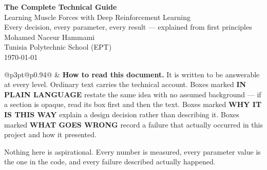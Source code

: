 \documentclass[11pt, a4paper]{report}
\begin{document}
\thispagestyle{empty}
\begin{center}
\vspace*{2.5cm}
{\Huge\bfseries\color{navy} The Complete Technical Guide}\\[10pt]
{\LARGE Learning Muscle Forces with Deep Reinforcement Learning}\\[24pt]
{\large Every decision, every parameter, every result --- explained from first principles}\\[36pt]
{\large Mohamed Naceur Hammami}\\[8pt]
{\normalsize Tunisia Polytechnic School (EPT)}\\[20pt]
{\normalsize\today}
\end{center}

\vspace{2cm}
\noindent
\begin{tabular}{@{}p{3pt}@{\hspace{10pt}}p{0.94\linewidth}@{}}
 & \textbf{How to read this document.} It is written to be
answerable at every level. Ordinary text carries the technical account. Boxes
marked \textbf{\color{accent}IN PLAIN LANGUAGE} restate the same idea with no
assumed background --- if a section is opaque, read its box first and then the
text. Boxes marked \textbf{\color{greenrule}WHY IT IS THIS WAY} explain a design
decision rather than describing it. Boxes marked \textbf{\color{warmrule}WHAT
GOES WRONG} record a failure that actually occurred in this project and how it
presented.

Nothing here is aspirational. Every number is measured, every parameter value is
the one in the code, and every failure described actually happened.
\end{tabular}

\clearpage
\tableofcontents







\end{document}
